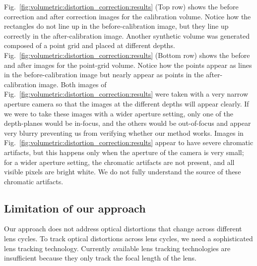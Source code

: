 Fig.~\ref{fig:volumetric:distortion_correction:results} (Top row) shows the before correction and after correction images for the calibration volume.
Notice how the rectangles do not line up in the before-calibration image, but they line up correctly in the after-calibration image. 
Another synthetic volume was generated composed of a point grid and placed at different depths. 
Fig.~\ref{fig:volumetric:distortion_correction:results} (Bottom row) shows the before and after images for the point-grid volume.
Notice how the points appear as lines in the before-calibration image but nearly appear as points in the after-calibration image.
Both images of Fig.~\ref{fig:volumetric:distortion_correction:results} were taken with a very narrow aperture camera so that the images at the different depths will appear clearly.
If we were to take these images with a wider aperture setting, only one of the depth-planes would be in-focus, and the others would be out-of-focus and appear very blurry preventing us from verifying whether our method works.
Images in Fig.~\ref{fig:volumetric:distortion_correction:results} appear to have severe chromatic artifacts, but this happens only when the aperture of the camera is very small; for a wider aperture setting, the chromatic artifacts are not present, and all visible pixels are bright white.
We do not fully understand the source of these chromatic artifacts. 

\subsection{Limitation of our approach}
Our approach does not address optical distortions that change across different lens cycles. To track optical distortions across lens cycles, we need a sophisticated lens tracking technology. Currently available lens tracking technologies are insufficient because they only track the focal length of the lens.

